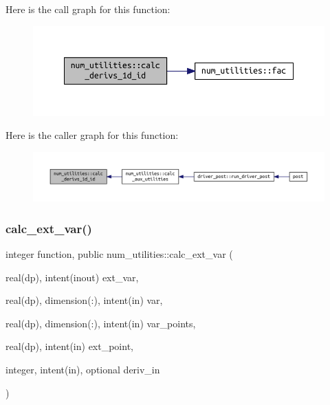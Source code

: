 Here is the call graph for this function\+:
\nopagebreak
\begin{figure}[H]
\begin{center}
\leavevmode
\includegraphics[width=350pt]{namespacenum__utilities_af2e9ffd7ce2f9391bf8b6f1c344fabca_cgraph}
\end{center}
\end{figure}
Here is the caller graph for this function\+:
\nopagebreak
\begin{figure}[H]
\begin{center}
\leavevmode
\includegraphics[width=350pt]{namespacenum__utilities_af2e9ffd7ce2f9391bf8b6f1c344fabca_icgraph}
\end{center}
\end{figure}
\mbox{\label{namespacenum__utilities_a2d5d9c66db19fb6edeeb50db6182397f}} 
\subsubsection{\texorpdfstring{calc\+\_\+ext\+\_\+var()}{calc\_ext\_var()}}
{\footnotesize\ttfamily integer function, public num\+\_\+utilities\+::calc\+\_\+ext\+\_\+var (\begin{DoxyParamCaption}\item[{real(dp), intent(inout)}]{ext\+\_\+var,  }\item[{real(dp), dimension(\+:), intent(in)}]{var,  }\item[{real(dp), dimension(\+:), intent(in)}]{var\+\_\+points,  }\item[{real(dp), intent(in)}]{ext\+\_\+point,  }\item[{integer, intent(in), optional}]{deriv\+\_\+in }\end{DoxyParamCaption})}



